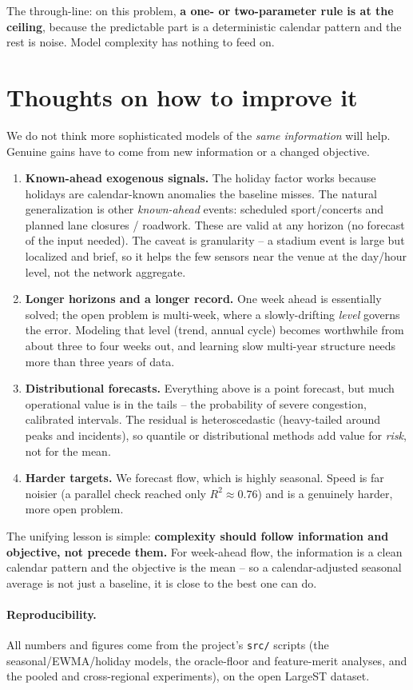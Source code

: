 \documentclass[11pt]{article}
\begin{document}
The through-line: on this problem, \textbf{a one- or two-parameter rule is at the
ceiling}, because the predictable part is a deterministic calendar pattern and the
rest is noise. Model complexity has nothing to feed on.

\section{Thoughts on how to improve it}

We do not think more sophisticated models of the \emph{same information} will help.
Genuine gains have to come from new information or a changed objective.

\begin{enumerate}\itemsep3pt
\item \textbf{Known-ahead exogenous signals.} The holiday factor works because
  holidays are calendar-known anomalies the baseline misses. The natural
  generalization is other \emph{known-ahead} events: scheduled sport/concerts and
  planned lane closures / roadwork. These are valid at any horizon (no forecast of
  the input needed). The caveat is granularity -- a stadium event is large but
  localized and brief, so it helps the few sensors near the venue at the day/hour
  level, not the network aggregate.
\item \textbf{Longer horizons and a longer record.} One week ahead is essentially
  solved; the open problem is multi-week, where a slowly-drifting \emph{level}
  governs the error. Modeling that level (trend, annual cycle) becomes worthwhile
  from about three to four weeks out, and learning slow multi-year structure needs
  more than three years of data.
\item \textbf{Distributional forecasts.} Everything above is a point forecast, but
  much operational value is in the tails -- the probability of severe congestion,
  calibrated intervals. The residual is heteroscedastic (heavy-tailed around peaks
  and incidents), so quantile or distributional methods add value for \emph{risk},
  not for the mean.
\item \textbf{Harder targets.} We forecast flow, which is highly seasonal. Speed is
  far noisier (a parallel check reached only $R^2 \approx 0.76$) and is a genuinely
  harder, more open problem.
\end{enumerate}

\noindent
The unifying lesson is simple: \textbf{complexity should follow information and
objective, not precede them.} For week-ahead flow, the information is a clean
calendar pattern and the objective is the mean -- so a calendar-adjusted seasonal
average is not just a baseline, it is close to the best one can do.

\paragraph{Reproducibility.} All numbers and figures come from the project's
\texttt{src/} scripts (the seasonal/EWMA/holiday models, the oracle-floor and
feature-merit analyses, and the pooled and cross-regional experiments), on the open
LargeST dataset.
\end{document}
